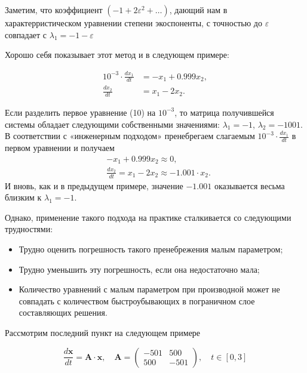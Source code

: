 	Заметим, что коэффициент $(-1 + 2\varepsilon^2 + \dots)$, дающий нам в характерристическом уравнении степени экоспоненты, с точностью до $\varepsilon$ совпадает с $\lambda_1 = - 1 - \varepsilon$
	
	\vspace{1em}
	
	Хорошо себя показывает этот метод и в следующем примере:
	
	\begin{align}
		10^{-3} \cdot \frac{dx_1}{dt} &= -x_1 + 0.999x_2, \\
		\frac{dx_2}{dt} &= x_1 - 2x_2 \tag{10}.
	\end{align}
	
	Если разделить первое уравнение (10) на $10^{-3}$, то матрица получившейся системы обладает следующими собственными значениями: $\lambda_1 = -1$, $\lambda_2 = -1001$. В соответствии с «инженерным подходом» пренебрегаем слагаемым $10^{-3} \cdot \frac{dx_1}{dt}$ в первом уравнении и получаем
	\begin{align*}
		& -x_1 + 0.999x_2 \approx 0, \\
		& \frac{dx_2}{dt} = x_1 - 2x_2 \approx -1.001 \cdot x_2.
	\end{align*}
	И вновь, как и в предыдущем примере, значение $-1.001$ оказывается весьма близким к $\lambda_1 = -1$.
	
	Однако, применение такого подхода на практике сталкивается со следующими трудностями:
	
	\begin{itemize}
		\item Трудно оценить погрешность такого пренебрежения малым параметром;
		\item Трудно уменьшить эту погрешность, если она недостаточно мала;
		\item Количество уравнений с малым параметром при производной может не совпадать с количеством быстроубывающих в пограничном слое составляющих решения.
	\end{itemize}
	
	Рассмотрим последний пункт на следующем примере
	
	\begin{equation}
		\frac{d\mathbf{x}}{dt} = \mathbf{A} \cdot \mathbf{x}, \quad 
		\mathbf{A} = \begin{pmatrix}
			-501 & 500 \\
			500 & -501
		\end{pmatrix}, \quad t \in [0, 3]
		\label{eq:leaving_derivatives_bad_example}
	\end{equation}
	
